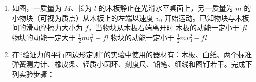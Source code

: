 \documentclass[\gkver]{gaokaozhenti}
\begin{document}
\begin{enumerate}
{

可见  $U_{34} > 0$，A 错误；

B．根据题意画出电路图，如下


可见  $U_{34} > 0$，B 错误；

C. 根据题意画出电路图，如下


可见上述接法可符合上述测量结果，C 正确；

D．根据题意画出电路图，如下


可见上述接法可符合上述测量结果，D 正确。

故选 CD。
}

\item
如图，一质量为 $M$、长为 $l$ 的木板静止在光滑水平桌面上，另一质量为 $m$ 的小物块（可视为质点）从木板上的左端以速度 $v_{0}$ 开始运动。已知物块与木板间的滑动摩擦力大小为 $f$，当物块从木板右端离开时
{木板的动能一定小于 $fl$}
{物块的动能一定大于 $\frac{1}{2}mv_{0}^{2} - fl$}
{物块的动能一定小于 $\frac{1}{2}mv_{0}^{2} - fl$}

\item
在“验证力的平行四边形定则”的实验中使用的器材有：木板、白纸、两个标准弹簧测力计、橡皮条、轻质小圆环、刻度尺、铅笔、细线和图钉若干。完成下列实验步骤：


\end{enumerate}
\end{document}
